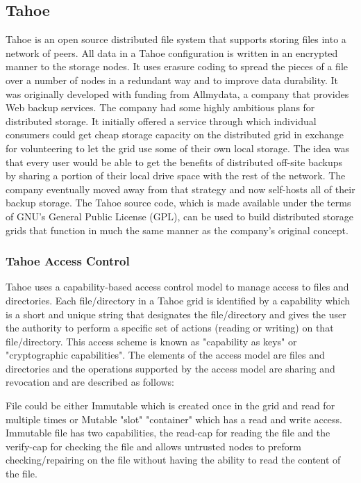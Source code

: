 \documentclass[11pt]{article}
\begin{document}
\subsection{Tahoe}
Tahoe is an open source distributed file system that supports storing 
files into a network of peers. All data in a Tahoe configuration is 
written in an encrypted manner to the storage nodes. It uses erasure 
coding to spread the pieces of a file over a number of nodes in a 
redundant way and to improve data durability. It was originally 
developed with funding from Allmydata, a company that provides Web 
backup services. The company had some highly ambitious plans for 
distributed storage. It initially offered a service through which 
individual consumers could get cheap storage capacity on the 
distributed grid in exchange for volunteering to let the grid use 
some of their own local storage. The idea was that every user would 
be able to get the benefits of distributed off-site backups by sharing 
a portion of their local drive space with the rest of the network. The 
company eventually moved away from that strategy and now self-hosts all 
of their backup storage. The Tahoe source code, which is made available 
under the terms of GNU's General Public License (GPL), can be used to 
build distributed storage grids that function in much the same manner 
as the company’s original concept.

\subsubsection{Tahoe Access Control}
Tahoe uses a capability-based access control model to manage access to 
files and directories. Each file/directory in a Tahoe grid is identified 
by a capability which is a short and unique string that designates the 
file/directory and gives the user the authority to perform a specific 
set of actions (reading or writing) on that file/directory. This access 
scheme is known as "capability as keys" or "cryptographic capabilities". 
The elements of the access model are files and directories and the 
operations supported by the access model are sharing and revocation and 
are described as follows: 

File could be either Immutable which is created once in the grid and read 
for multiple times or Mutable "slot" "container" which has a read and 
write access. Immutable file has two capabilities, the read-cap for 
reading the file and the verify-cap for checking the file and allows 
untrusted nodes to preform checking/repairing on the file without having 
the ability to read the content of the file. 
\end{document}

